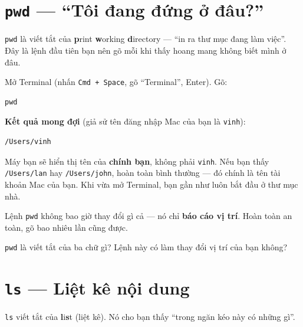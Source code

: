 \documentclass[12pt,a4paper]{article}
\begin{document}
\section{\texttt{pwd} --- ``Tôi đang đứng ở đâu?''}

\texttt{pwd} là viết tắt của \textbf{p}rint \textbf{w}orking \textbf{d}irectory --- ``in ra thư mục đang làm việc''. Đây là lệnh đầu tiên bạn nên gõ mỗi khi thấy hoang mang không biết mình ở đâu.

\begin{labbox}
Mở Terminal (nhấn \texttt{Cmd + Space}, gõ ``Terminal'', Enter). Gõ:
\begin{codebox}
\begin{verbatim}
pwd
\end{verbatim}
\end{codebox}
\textbf{Kết quả mong đợi} (giả sử tên đăng nhập Mac của bạn là \texttt{vinh}):
\begin{codebox}
\begin{verbatim}
/Users/vinh
\end{verbatim}
\end{codebox}
\end{labbox}

\begin{notebox}[title={Trấn an}]
Máy bạn sẽ hiển thị tên của \textbf{chính bạn}, không phải \texttt{vinh}. Nếu bạn thấy \texttt{/Users/lan} hay \texttt{/Users/john}, hoàn toàn bình thường --- đó chính là tên tài khoản Mac của bạn. Khi vừa mở Terminal, bạn gần như luôn bắt đầu ở thư mục nhà.
\end{notebox}

Lệnh \texttt{pwd} không bao giờ thay đổi gì cả --- nó chỉ \textbf{báo cáo vị trí}. Hoàn toàn an toàn, gõ bao nhiêu lần cũng được.

\begin{checkbox}[title={Tự kiểm tra 2}]
\texttt{pwd} là viết tắt của ba chữ gì? Lệnh này có làm thay đổi vị trí của bạn không?
\end{checkbox}

\section{\texttt{ls} --- Liệt kê nội dung}

\texttt{ls} viết tắt của \textbf{l}i\textbf{s}t (liệt kê). Nó cho bạn thấy ``trong ngăn kéo này có những gì''.
\end{document}
